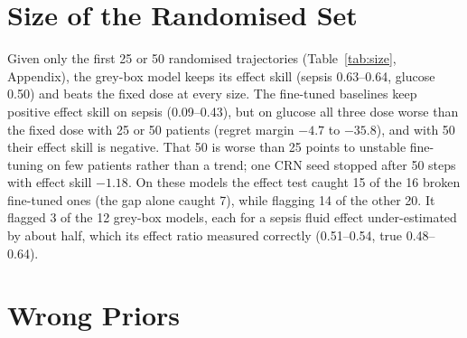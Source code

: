 \documentclass[letterpaper]{article}
\begin{document}
\section{Size of the Randomised Set}
\label{sec:size}

Given only the first 25 or 50 randomised trajectories (Table~\ref{tab:size}, Appendix), the grey-box model keeps its effect skill (sepsis 0.63--0.64, glucose 0.50) and beats the fixed dose at every size. The fine-tuned baselines keep positive effect skill on sepsis (0.09--0.43), but on glucose all three dose worse than the fixed dose with 25 or 50 patients (regret margin $-4.7$ to $-35.8$), and with 50 their effect skill is negative. That 50 is worse than 25 points to unstable fine-tuning on few patients rather than a trend; one CRN seed stopped after 50 steps with effect skill $-1.18$. On these models the effect test caught 15 of the 16 broken fine-tuned ones (the gap alone caught 7), while flagging 14 of the other 20. It flagged 3 of the 12 grey-box models, each for a sepsis fluid effect under-estimated by about half, which its effect ratio measured correctly (0.51--0.54, true 0.48--0.64).

\begin{table}[h]
\centering
\resizebox{\columnwidth}{!}{}
\caption{Size study at $\lambda=1$: models given only the first $n$ of the 100 randomised trajectories ($n=100$ is the main sweep), mean of 3 seeds. Our model is in bold. Effect skill under a sustained dose increase of the first drug, and regret margin: regret of the fixed best dose minus the model's regret (positive is better than the fixed dose). The unadjusted GRU uses the randomised set only for early stopping.}
\label{tab:size}
\end{table}

\section{Wrong Priors}
\label{sec:misspec}
\end{document}

